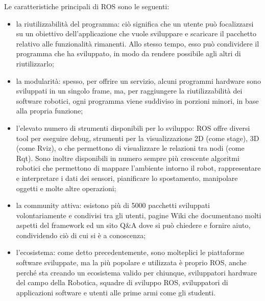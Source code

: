 Le caratteristiche principali di ROS sono le seguenti:
\begin{itemize}
\item la riutilizzabilità del programma: ciò significa che un utente può focalizzarsi su un obiettivo dell’applicazione che vuole sviluppare e scaricare il pacchetto relativo alle funzionalità rimanenti. Allo stesso tempo, esso può condividere il programma che ha sviluppato, in modo da rendere possibile agli altri di riutilizzarlo;
\item la modularità: spesso, per offrire un servizio, alcuni programmi hardware sono sviluppati in un singolo frame, ma, per raggiungere la riutilizzabilità dei software robotici, ogni programma viene suddiviso in porzioni minori, in base alla propria funzione;
\item l'elevato numero di strumenti disponibili per lo sviluppo: ROS offre diversi tool per eseguire debug, strumenti per la visualizzazione 2D (come stage), 3D (come Rviz), o che permettono di visualizzare le relazioni tra nodi (come Rqt). Sono inoltre disponibili in numero sempre più crescente algoritmi robotici che permettono di mappare l’ambiente intorno il robot, rappresentare e interpretare i dati dei sensori, pianificare lo spostamento, manipolare oggetti e molte altre operazioni;
\item la community attiva: esistono più di 5000 pacchetti sviluppati volontariamente e condivisi tra gli utenti, pagine Wiki che documentano molti aspetti del framework ed un sito Q\&A dove si può chiedere e fornire aiuto, condividendo ciò di cui si è a conoscenza;
\item l'ecosistema: come detto precedentemente, sono molteplici le piattaforme software sviluppate, ma la più popolare e utilizzata è proprio ROS, anche perché sta creando un ecosistema valido per chiunque, sviluppatori hardware del campo della Robotica, squadre di sviluppo ROS, sviluppatori di applicazioni software e utenti alle prime armi come gli studenti.
\end{itemize}

